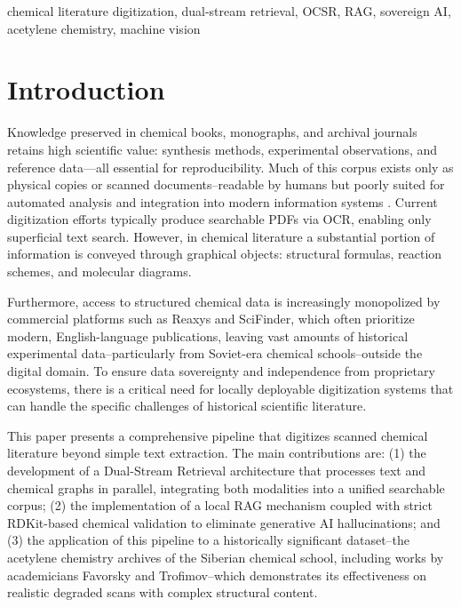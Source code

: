 \documentclass[conference]{IEEEtran}
\begin{document}
\begin{IEEEkeywords}
chemical literature digitization, dual-stream retrieval, OCSR, RAG, sovereign AI, acetylene chemistry, machine vision
\end{IEEEkeywords}

\section{Introduction}

Knowledge preserved in chemical books, monographs, and archival journals retains high scientific value: synthesis methods, experimental observations, and reference data—all essential for reproducibility. Much of this corpus exists only as physical copies or scanned documents--readable by humans but poorly suited for automated analysis and integration into modern information systems \cite{ref1,ref2}. Current digitization efforts typically produce searchable PDFs via OCR, enabling only superficial text search. However, in chemical literature a substantial portion of information is conveyed through graphical objects: structural formulas, reaction schemes, and molecular diagrams.

Furthermore, access to structured chemical data is increasingly monopolized by commercial platforms such as Reaxys and SciFinder, which often prioritize modern, English-language publications, leaving vast amounts of historical experimental data--particularly from Soviet-era chemical schools--outside the digital domain. To ensure data sovereignty and independence from proprietary ecosystems, there is a critical need for locally deployable digitization systems that can handle the specific challenges of historical scientific literature.

This paper presents a comprehensive pipeline that digitizes scanned chemical literature beyond simple text extraction. The main contributions are: (1) the development of a Dual-Stream Retrieval architecture that processes text and chemical graphs in parallel, integrating both modalities into a unified searchable corpus; (2) the implementation of a local RAG mechanism coupled with strict RDKit-based chemical validation to eliminate generative AI hallucinations; and (3) the application of this pipeline to a historically significant dataset--the acetylene chemistry archives of the Siberian chemical school, including works by academicians Favorsky and Trofimov--which demonstrates its effectiveness on realistic degraded scans with complex structural content.
\end{document}
